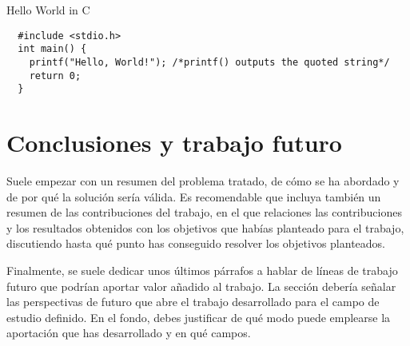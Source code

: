 \documentclass[12pt,a4paper]{proyectoinnovacion}
\begin{document}
\begin{listing}[!ht]
  \label{listing:2}
  \caption{Hello World in C} 
  \vspace{-5pt}
  \begin{verbatim}
  #include <stdio.h>
  int main() {
    printf("Hello, World!"); /*printf() outputs the quoted string*/
    return 0;
  }
  \end{verbatim}
\end{listing}

\section{Conclusiones y trabajo futuro}

Suele empezar con un resumen del problema tratado, de cómo se ha abordado y de por qué la solución sería válida. Es recomendable que incluya también un resumen de las contribuciones del trabajo, en el que relaciones las contribuciones y los resultados obtenidos con los objetivos que habías planteado para el trabajo, discutiendo hasta qué punto has conseguido resolver los objetivos planteados.

Finalmente, se suele dedicar unos últimos párrafos a hablar de líneas de trabajo futuro que podrían aportar valor añadido al trabajo. La sección debería señalar las perspectivas de futuro que abre el trabajo desarrollado para el campo de estudio definido. En el fondo, debes justificar de qué modo puede emplearse la aportación que has desarrollado y en qué campos.


\pagebreak
\printbibliography[title=Referencias bibliográficas]
\pagebreak





\end{document}
